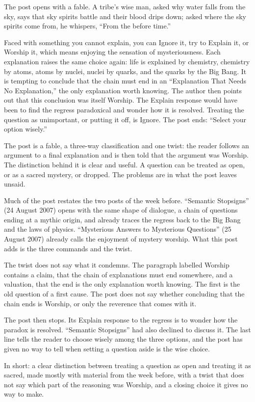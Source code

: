 \begin{afterword}
\summaryhead

The post opens with a fable. A tribe's wise man, asked why water falls from the sky, says that sky spirits battle and their blood drips down; asked where the sky spirits come from, he whispers, ``From the before time.''

Faced with something you cannot explain, you can Ignore it, try to Explain it, or Worship it, which means enjoying the sensation of mysteriousness. Each explanation raises the same choice again: life is explained by chemistry, chemistry by atoms, atoms by nuclei, nuclei by quarks, and the quarks by the Big Bang. It is tempting to conclude that the chain must end in an ``Explanation That Needs No Explanation,'' the only explanation worth knowing. The author then points out that this conclusion was itself Worship. The Explain response would have been to find the regress paradoxical and wonder how it is resolved. Treating the question as unimportant, or putting it off, is Ignore. The post ends: ``Select your option wisely.''

\responsehead

The post is a fable, a three-way classification and one twist: the reader follows an argument to a final explanation and is then told that the argument was Worship. The distinction behind it is clear and useful. A question can be treated as open, or as a sacred mystery, or dropped. The problems are in what the post leaves unsaid.

Much of the post restates the two posts of the week before. ``Semantic Stopsigns'' (24 August 2007) opens with the same shape of dialogue, a chain of questions ending at a mythic origin, and already traces the regress back to the Big Bang and the laws of physics. ``Mysterious Answers to Mysterious Questions'' (25 August 2007) already calls the enjoyment of mystery worship. What this post adds is the three commands and the twist.

The twist does not say what it condemns. The paragraph labelled Worship contains a claim, that the chain of explanations must end somewhere, and a valuation, that the end is the only explanation worth knowing. The first is the old question of a first cause. The post does not say whether concluding that the chain ends is Worship, or only the reverence that comes with it.

The post then stops. Its Explain response to the regress is to wonder how the paradox is resolved. ``Semantic Stopsigns'' had also declined to discuss it. The last line tells the reader to choose wisely among the three options, and the post has given no way to tell when setting a question aside is the wise choice.

In short: a clear distinction between treating a question as open and treating it as sacred, made mostly with material from the week before, with a twist that does not say which part of the reasoning was Worship, and a closing choice it gives no way to make.
\end{afterword}
